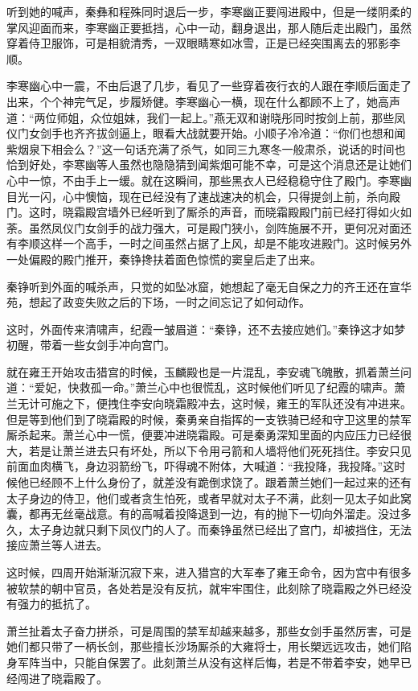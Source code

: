 听到她的喊声，秦彝和程殊同时退后一步，李寒幽正要闯进殿中，但是一缕阴柔的掌风迎面而来，李寒幽正要抵挡，心中一动，翻身退出，那人随后走出殿门，虽然穿着侍卫服饰，可是相貌清秀，一双眼睛寒如冰雪，正是已经突围离去的邪影李顺。

李寒幽心中一震，不由后退了几步，看见了一些穿着夜行衣的人跟在李顺后面走了出来，个个神完气足，步履矫健。李寒幽心一横，现在什么都顾不上了，她高声道：“两位师姐，众位姐妹，我们一起上。”燕无双和谢晓彤同时按剑上前，那些凤仪门女剑手也齐齐拔剑逼上，眼看大战就要开始。小顺子冷冷道：“你们也想和闻紫烟泉下相会么？”这一句话充满了杀气，如同三九寒冬一般肃杀，说话的时间也恰到好处，李寒幽等人虽然也隐隐猜到闻紫烟可能不幸，可是这个消息还是让她们心中一惊，不由手上一缓。就在这瞬间，那些黑衣人已经稳稳守住了殿门。李寒幽目光一闪，心中懊恼，现在已经没有了速战速决的机会，只得提剑上前，杀向殿门。这时，晓霜殿宫墙外已经听到了厮杀的声音，而晓霜殿殿门前已经打得如火如荼。虽然凤仪门女剑手的战力强大，可是殿门狭小，剑阵施展不开，更何况对面还有李顺这样一个高手，一时之间虽然占据了上风，却是不能攻进殿门。这时候另外一处偏殿的殿门推开，秦铮搀扶着面色惊慌的窦皇后走了出来。

秦铮听到外面的喊杀声，只觉的如坠冰窟，她想起了毫无自保之力的齐王还在宣华苑，想起了政变失败之后的下场，一时之间忘记了如何动作。

这时，外面传来清啸声，纪霞一皱眉道：“秦铮，还不去接应她们。”秦铮这才如梦初醒，带着一些女剑手冲向宫门。

就在雍王开始攻击猎宫的时候，玉麟殿也是一片混乱，李安魂飞魄散，抓着萧兰问道：“爱妃，快救孤一命。”萧兰心中也很慌乱，这时候他们听见了纪霞的啸声。萧兰无计可施之下，便拽住李安向晓霜殿冲去，这时候，雍王的军队还没有冲进来。但是等到他们到了晓霜殿的时候，秦勇亲自指挥的一支铁骑已经和守卫这里的禁军厮杀起来。萧兰心中一慌，便要冲进晓霜殿。可是秦勇深知里面的内应压力已经很大，若是让萧兰进去只有坏处，所以下令用弓箭和人墙将他们死死挡住。李安只见前面血肉横飞，身边羽箭纷飞，吓得魂不附体，大喊道：“我投降，我投降。”这时候他已经顾不上什么身份了，就差没有跪倒求饶了。跟着萧兰她们一起过来的还有太子身边的侍卫，他们或者贪生怕死，或者早就对太子不满，此刻一见太子如此窝囊，都再无丝毫战意。有的高喊着投降退到一边，有的抛下一切向外溜走。没过多久，太子身边就只剩下凤仪门的人了。而秦铮虽然已经出了宫门，却被挡住，无法接应萧兰等人进去。

这时候，四周开始渐渐沉寂下来，进入猎宫的大军奉了雍王命令，因为宫中有很多被软禁的朝中官员，各处若是没有反抗，就牢牢围住，此刻除了晓霜殿之外已经没有强力的抵抗了。

萧兰扯着太子奋力拼杀，可是周围的禁军却越来越多，那些女剑手虽然厉害，可是她们都只带了一柄长剑，那些擅长沙场厮杀的大雍将士，用长槊远远攻击，她们陷身军阵当中，只能自保罢了。此刻萧兰从没有这样后悔，若是不带着李安，她早已经闯进了晓霜殿了。

